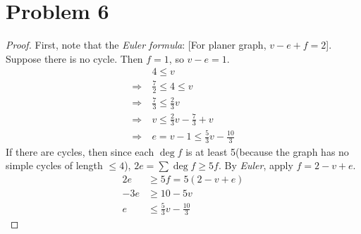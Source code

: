 \section*{Problem 6}\label{problem 6}
	\begin{proof}
		First, note that the \textit{Euler formula}: [For planer graph, $v - e + f = 2$]. Suppose there is no cycle. Then $f = 1$, so $v - e = 1$.
		\begin{align*}
			& 4 \leq v\\
			\Rightarrow\ & \frac{7}{2} \leq 4 \leq v\\
			\Rightarrow\ & \frac{7}{3} \leq \frac{2}{3}v\\
			\Rightarrow\ & v \leq \frac{2}{3}v - \frac{7}{3} + v\\
			\Rightarrow\ & e = v - 1\leq \frac{5}{3}v - \frac{10}{3}
		\end{align*}
		If there are cycles, then since each $\deg{f}$ is at least 5(because the graph has no simple cycles of length $\leq4$), $2e = \sum\deg{f} \geq 5f$. By \textit{Euler}, apply $f = 2 - v + e$.
		\begin{align*}
			2e &\geq 5f = 5(2 - v + e)\\
			-3e &\geq 10 - 5v\\
			e &\leq \frac{5}{3}v - \frac{10}{3}
		\end{align*}
	\end{proof}
